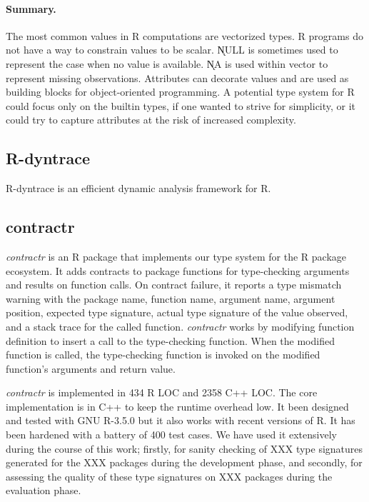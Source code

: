 \documentclass[acmsmall,review,anonymous]{acmart}\settopmatter{printfolios=true,printccs=false,printacmref=false}
\newcommand{\contractr}{\emph{contractr}\xspace} %
\begin{document}
\paragraph{Summary.} The most common values in R computations are vectorized
types. R programs do not have a way to constrain values to be scalar.
\k{NULL} is sometimes used to represent the case when no value is
available. \k{NA} is used within vector to represent missing observations.
Attributes can decorate values and are used as building blocks for
object-oriented programming. A potential type system for R could focus only
on the builtin types, if one wanted to strive for simplicity, or it could
try to capture attributes at the risk of increased complexity.

%
%
%
%
\subsection{R-dyntrace}
\label{sec:r-dyntrace}


R-dyntrace is an efficient dynamic analysis framework for R.

\subsection{contractr}
\label{sec:contractr}


\contractr is an R package that implements our type system for the R
package ecosystem. It adds contracts to package functions for type-checking
arguments and results on function calls. On contract failure, it reports a type
mismatch warning with the package name, function name, argument name, argument
position, expected type signature, actual type signature of the value observed,
and a stack trace for the called function. \contractr works by modifying
function definition to insert a call to the type-checking function. When the
modified function is called, the type-checking function is invoked on the
modified function's arguments and return value.

\contractr is implemented in 434 R LOC and 2358 C++ LOC. The core
implementation is in C++ to keep the runtime overhead low. It been designed and
tested with GNU R-3.5.0 but it also works with recent versions of R. It has been
hardened with a battery of 400 test cases. We have used it extensively during
the course of this work; firstly, for sanity checking of XXX type signatures
generated for the XXX packages during the development phase, and secondly, for
assessing the quality of these type signatures on XXX packages during the
evaluation phase.
\end{document}
